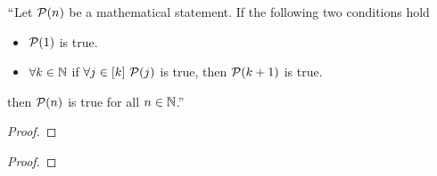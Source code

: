         \begin{corollary}
            $``$Let $\mathcal{P}(n)$ be a mathematical statement.
            If the following two conditions hold
            \begin{itemize}
                \item
                    $\mathcal{P}(1)$ is true.
                \item
                    $\forall k \in \mathbb{N}$ if $\forall j \in [k] \ \mathcal{P}(j)$ is 
                    true, then $\mathcal{P}(k + 1)$ is true.
            \end{itemize}
            then $\mathcal{P}(n)$ is true for all $n \in \mathbb{N}$.''
        \end{corollary}
        \begin{proof}
        \end{proof}
        \begin{corollary}
        \end{corollary}
        \begin{proof}
        \end{proof}
